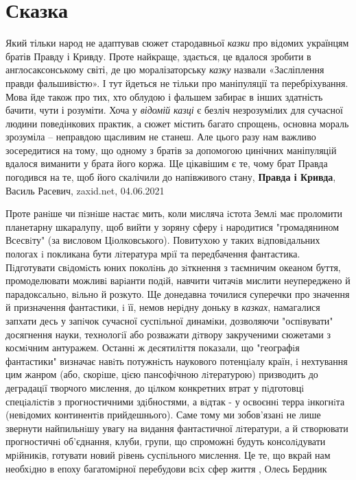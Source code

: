  
 
 
 
 
\chapter{Сказка}
\label{sec:slova.skazka}

Який тільки народ не адаптував сюжет стародавньої \emph{казки} про відомих
українцям братів Правду і Кривду. Проте найкраще, здається, це вдалося зробити
в англосаксонському світі, де цю моралізаторську \emph{казку} назвали
«Засліплення правди фальшивістю». І тут йдеться не тільки про маніпуляції та
перебріхування.  Мова йде також про тих, хто облудою і фальшем забирає в інших
здатність бачити, чути і розуміти. Хоча у \emph{відомій казці} є безліч
незрозумілих для сучасної людини поведінкових практик, а сюжет містить багато
спрощень, основна мораль зрозуміла – неправдою щасливим не станеш. Але цього
разу нам важливо зосередитися на тому, що одному з братів за допомогою цинічних
маніпуляцій вдалося виманити у брата його коржа. Ще цікавішим є те, чому брат
Правда погодився на те, щоб його скалічили до напівживого стану,
\textbf{Правда і Кривда}, Василь Расевич, zaxid.net, 04.06.2021


Проте ранiше чи пiзнiше настає мить, коли мисляча iстота Землi має проломити
планетарну шкаралупу, щоб вийти у зоряну сферу i народитися "громадянином
Всесвiту" (за висловом Цiолковського). Повитухою у таких вiдповiдальних пологах
i покликана бути лiтература мрiї та передбачення фантастика. Пiдготувати
свiдомiсть юних поколiнь до зiткнення з таємничим океаном буття, промоделювати
можливi варiанти подiй, навчити читачiв мислити неупереджено й парадоксально,
вiльно й розкуто. Ще донедавна точилися суперечки про значення й призначення
фантастики, i її, немов нерiдну доньку в \emph{казках}, намагалися запхати десь у
запiчок сучасної суспiльної динамiки, дозволяючи "оспiвувати" досягнення науки,
технологiї або розважати дiтвору закрученими сюжетами з космiчним антуражем.
Останнi ж десятилiття показали, що "географiя фантастики" визначає навiть
потужнiсть наукового потенцiалу країн, i нехтування цим жанром (або, скорiше,
цiєю пансофiчною лiтературою) призводить до деградацiї творчого мислення, до
цiлком конкретних втрат у пiдготовцi спецiалiстiв з прогностичними здiбностями,
а вiдтак - у освоєннi терра iнкогнiта (невiдомих континентiв прийдешнього).
Саме тому ми зобов'язанi не лише звернути найпильнiшу увагу на видання
фантастичної лiтератури, а й створювати прогностичнi об'єднання, клуби, групи,
що спроможнi будуть консолiдувати мрiйникiв, готувати новий рiвень суспiльного
мислення. Це те, що вкрай нам необхiдно в епоху багатомiрної перебудови всiх
сфер життя
, Олесь Бердник
